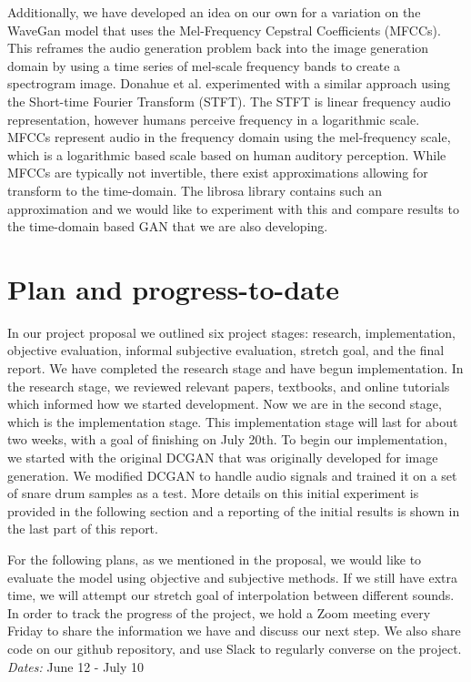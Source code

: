 \documentclass{article} %
\begin{document}
Additionally, we have developed an idea on our own for a variation on the WaveGan model that uses the Mel-Frequency Cepstral Coefficients (MFCCs). This reframes the audio generation problem back into the image generation domain by using a time series of mel-scale frequency bands to create a spectrogram image. Donahue et al. experimented with a similar approach using the Short-time Fourier Transform (STFT). The STFT is linear frequency audio representation, however humans perceive frequency in a logarithmic scale. MFCCs represent audio in the frequency domain using the mel-frequency scale, which is a logarithmic based scale based on human auditory perception. While MFCCs are typically not invertible, there exist approximations allowing for transform to the time-domain. The librosa library contains such an approximation and we would like to experiment with this and compare results to the time-domain based GAN that we are also developing. 

\section{Plan and progress-to-date}
In our project proposal we outlined six project stages: research, implementation, objective evaluation, informal subjective evaluation, stretch goal, and the final report. We have completed the research stage and have begun implementation. In the research  stage, we reviewed relevant papers, textbooks, and online tutorials which informed how we started development. Now we are in the second stage, which is the implementation stage. This implementation stage will last for about two weeks, with a goal of finishing on July 20th. To begin our implementation, we started with the original DCGAN that was originally developed for image generation. We modified DCGAN to handle audio signals and trained it on a set of snare drum samples as a test. More details on this initial experiment is provided in the following section and a reporting of the initial results is shown in the last part of this report. 

For the following plans, as we mentioned in the proposal, we would like to evaluate the model using objective and subjective methods. If we still have extra time, we will attempt our stretch goal of interpolation between different sounds. In order to track the progress of the project, we hold a Zoom meeting every Friday to share the information we have and discuss our next step. We also share code on our github repository, and use Slack to regularly converse on the project.
 \emph{Dates:} June 12 - July 10 
\end{document}
